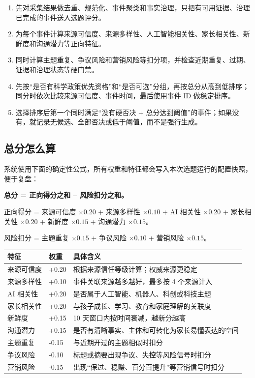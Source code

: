 \documentclass[UTF8,11pt,a4paper,fontset=none]{ctexart}
\begin{document}
\begin{enumerate}[leftmargin=2em,itemsep=0.28em]
  \item 先对采集结果做去重、规范化、事件聚类和事实治理，只把有可用证据、治理已完成的事件送入选题评分。
  \item 为每个事件计算来源可信度、来源多样性、人工智能相关性、家长相关性、新鲜度和沟通潜力等正向特征。
  \item 同时计算主题重复、争议风险和营销风险等扣分项，并检查近期重复、过期、证据和治理状态等硬门禁。
  \item 先按“是否有科学政策优先资格”和“是否可选”分组，再按总分从高到低排序；同分时依次比较来源可信度、事件时间，最后使用事件 ID 做稳定排序。
  \item 选择排序后第一个同时满足“没有硬否决 + 总分达到阈值”的事件；如果没有，就记录无候选、全部否决或低于阈值，而不是强行生成。
\end{enumerate}

\subsection{总分怎么算}

系统使用下面的确定性公式，所有权重和特征都会写入本次选题运行的配置快照，便于复盘：

\begin{focusbox}
\textbf{总分 = 正向得分之和 -- 风险扣分之和。}

正向得分 = 来源可信度 $\times 0.20$ + 来源多样性 $\times 0.10$ + AI 相关性 $\times 0.20$ + 家长相关性 $\times 0.20$ + 新鲜度 $\times 0.15$ + 沟通潜力 $\times 0.15$。

风险扣分 = 主题重复 $\times 0.15$ + 争议风险 $\times 0.10$ + 营销风险 $\times 0.15$。
\end{focusbox}

{\small
\begin{tabularx}{0.96\textwidth}{L{4.6cm}L{1.7cm}Y}
\toprule
{}
\color{white}\bfseries\sffamily 特征 & \color{white}\bfseries\sffamily 权重 & \color{white}\bfseries\sffamily 具体含义 \\
\midrule
来源可信度 & +0.20 & 根据来源信任等级计算；权威来源更稳定 \\
来源多样性 & +0.10 & 事件关联来源越多越好，最多按 4 个来源计入 \\
AI 相关性 & +0.20 & 是否属于人工智能、机器人、科创或科技主题 \\
家长相关性 & +0.20 & 与孩子成长、学习、教育和家庭理解的关联度 \\
新鲜度 & +0.15 & 10 天窗口内按时间衰减，越新分越高 \\
沟通潜力 & +0.15 & 是否有清晰事实、主体和可转化为家长易懂表达的空间 \\
主题重复 & -0.15 & 与近期开过的主题相似时扣分 \\
争议风险 & -0.10 & 标题或摘要出现争议、失控等风险信号时扣分 \\
营销风险 & -0.15 & 出现“保过、稳赚、百分百提升”等营销信号时扣分 \\
\bottomrule
\end{tabularx}\par}
\end{document}
